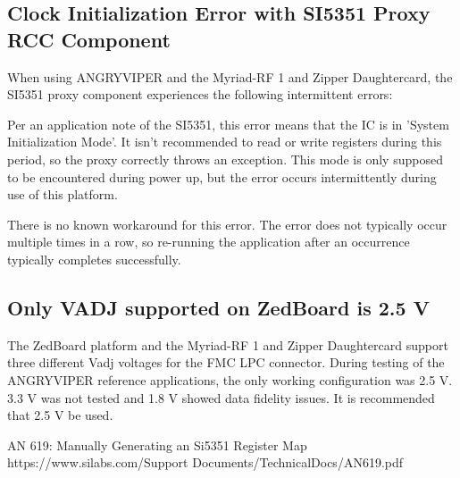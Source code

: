 \subsection*{Clock Initialization Error with SI5351 Proxy RCC Component}
When using ANGRYVIPER and the Myriad-RF 1 and Zipper Daughtercard, the SI5351 proxy component experiences the following intermittent errors:\par\medskip
\noindent {}\par\medskip
\noindent {}\par\medskip
\noindent Per an application note of the SI5351\cite{an_619}, this error means that the IC is in 'System Initialization Mode'. It isn't recommended to read or write registers during this period, so the proxy correctly throws an exception. This mode is only supposed to be encountered during power up, but the error occurs intermittently  during use of this platform.\par\medskip
\noindent There is no known workaround for this error. The error does not typically occur multiple times in a row, so re-running the application after an occurrence typically completes successfully.
\subsection*{Only VADJ supported on ZedBoard is 2.5 V}
The ZedBoard platform  and the Myriad-RF 1 and Zipper Daughtercard support three different Vadj voltages for the FMC LPC connector. During testing of the ANGRYVIPER reference applications, the only working configuration was 2.5 V. 3.3 V was not tested and 1.8 V showed data fidelity issues.  It is recommended that 2.5 V be used.
\pagebreak
  \begin{thebibliography}{1}

   AN 619: Manually Generating an Si5351 Register Map\\
  https://www.silabs.com/Support Documents/TechnicalDocs/AN619.pdf

  \end{thebibliography}

